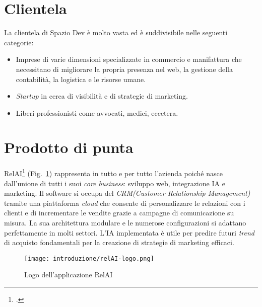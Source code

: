 \section{Clientela}
La clientela di Spazio Dev è molto vasta ed è suddivisibile nelle seguenti categorie:
\begin{itemize}
  \item Imprese di varie dimensioni specializzate in commercio e manifattura che necessitano di migliorare la propria presenza nel web, la gestione della contabilità, la logistica e le risorse umane.
  \item \emph{Startup} in cerca di visibilità e di strategie di marketing.
  \item Liberi professionisti come avvocati, medici, eccetera.
\end{itemize}



\section{Prodotto di punta}
RelAI\footcite{site:relai} (Fig.~\ref{fig:logo-RelAI}) rappresenta in tutto e per tutto l'azienda poiché nasce dall'unione di tutti i suoi \emph{core business}: sviluppo web, integrazione IA e marketing.
Il software si occupa del \emph{\gls{CRM}\glsfirstoccur (Customer Relationship Management)}  tramite una piattaforma \emph{cloud} che consente di personalizzare le relazioni con i clienti e di incrementare le vendite grazie a campagne di comunicazione su misura.
La sua architettura modulare e le numerose configurazioni si adattano perfettamente in molti settori. L'IA implementata è utile per predire futuri \emph{trend} di acquisto fondamentali per la creazione di strategie di marketing efficaci. 


\begin{figure}[!h] 
  \centering 
  \texttt{[image: introduzione/relAI-logo.png]} 
  \caption{Logo dell'applicazione RelAI}
  \label{fig:logo-RelAI}
\end{figure}


